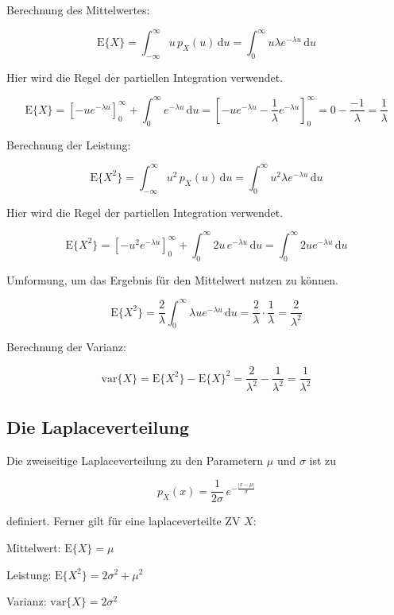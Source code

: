 \begin{beweis}
Berechnung des Mittelwertes:

$$
\mathrm{E}\{X\} = \int_{-\infty}^{\infty} u\, p_X(u)\,\mathrm{d}u = \int_0^{\infty} u \lambda e^{-\lambda u}\,\mathrm{d}u
$$

Hier wird die Regel der partiellen Integration verwendet.

$$
\mathrm{E}\{X\} = \left[-u e^{-\lambda u}\right]_0^{\infty} + \int_0^{\infty} e^{-\lambda u}\,\mathrm{d}u
= \left[-u e^{-\lambda u} - \frac{1}{\lambda} e^{-\lambda u}\right]_0^{\infty} = 0 - \frac{-1}{\lambda} = \frac{1}{\lambda}
$$

Berechnung der Leistung:

$$
\mathrm{E}\{X^2\} = \int_{-\infty}^{\infty} u^2\, p_X(u)\,\mathrm{d}u = \int_0^{\infty} u^2 \lambda e^{-\lambda u}\,\mathrm{d}u
$$

Hier wird die Regel der partiellen Integration verwendet.

$$
\mathrm{E}\{X^2\} = \left[-u^2 e^{-\lambda u}\right]_0^{\infty} + \int_0^{\infty} 2u\, e^{-\lambda u}\,\mathrm{d}u = \int_0^{\infty} 2u e^{-\lambda u}\,\mathrm{d}u
$$

Umformung, um das Ergebnis für den Mittelwert nutzen zu können.

$$
\mathrm{E}\{X^2\} = \frac{2}{\lambda} \int_0^{\infty} \lambda u e^{-\lambda u}\,\mathrm{d}u = \frac{2}{\lambda} \cdot \frac{1}{\lambda} = \frac{2}{\lambda^2}
$$

Berechnung der Varianz:

$$
\mathrm{var}\{X\} = \mathrm{E}\{X^2\} - \mathrm{E}\{X\}^2 = \frac{2}{\lambda^2} - \frac{1}{\lambda^2} = \frac{1}{\lambda^2}
$$
\end{beweis}


\subsection{Die Laplaceverteilung}
\label{sec:laplaceverteilung}

\begin{definition}[Laplaceverteilung]
Die zweiseitige Laplaceverteilung zu den Parametern $\mu$ und $\sigma$ ist zu

$$
p_X(x) = \frac{1}{2\sigma}\, e^{-\frac{|x-\mu|}{\sigma}}
$$

definiert. Ferner gilt für eine laplaceverteilte ZV $X$:

Mittelwert: $\mathrm{E}\{X\} = \mu$

Leistung: $\mathrm{E}\{X^2\} = 2\sigma^2 + \mu^2$

Varianz: $\mathrm{var}\{X\} = 2\sigma^2$
\end{definition}

